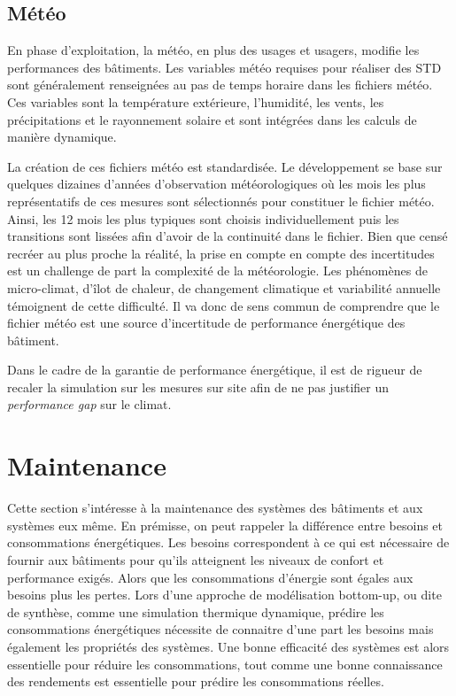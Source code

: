 \subsection{Météo}
\label{Météo}

En phase d'exploitation, la météo, en plus des usages et usagers, modifie les performances des bâtiments.  Les variables météo requises pour réaliser des STD sont généralement renseignées au pas de temps horaire dans les fichiers météo. Ces variables sont la température extérieure, l'humidité, les vents, les précipitations et le rayonnement solaire et sont intégrées dans les calculs de manière dynamique.

La création de ces fichiers météo est standardisée. Le développement se base sur quelques dizaines d'années d'observation météorologiques où les mois les plus représentatifs de ces mesures sont sélectionnés pour constituer le fichier météo. Ainsi, les 12 mois les plus typiques sont choisis individuellement puis les transitions sont lissées afin d'avoir de la continuité dans le fichier. Bien que censé recréer au plus proche la réalité, la prise en compte en compte des incertitudes est un challenge de part la complexité de la météorologie. Les phénomènes de micro-climat, d'îlot de chaleur, de changement climatique et variabilité annuelle témoignent de cette difficulté. Il va donc de sens commun de comprendre que le fichier météo est une source d'incertitude de performance énergétique des bâtiment.

Dans le cadre de la garantie de performance énergétique, il est de rigueur de recaler la simulation sur les mesures sur site afin de ne pas justifier un \textit{performance gap} sur le climat.

\section{Maintenance}

Cette section s'intéresse à la maintenance des systèmes des bâtiments et aux systèmes eux même. En prémisse, on peut rappeler la différence entre besoins et consommations énergétiques. Les besoins correspondent à ce qui est nécessaire de fournir aux bâtiments pour qu'ils atteignent les niveaux de confort et performance exigés. Alors que les consommations d'énergie sont égales aux besoins plus les pertes. Lors d'une approche de modélisation bottom-up, ou dite de synthèse, comme une simulation thermique dynamique, prédire les consommations énergétiques nécessite de connaitre d'une part les besoins mais également les propriétés des systèmes. Une bonne efficacité des systèmes est alors essentielle pour réduire les consommations, tout comme une bonne connaissance des rendements est essentielle pour prédire les consommations réelles.

